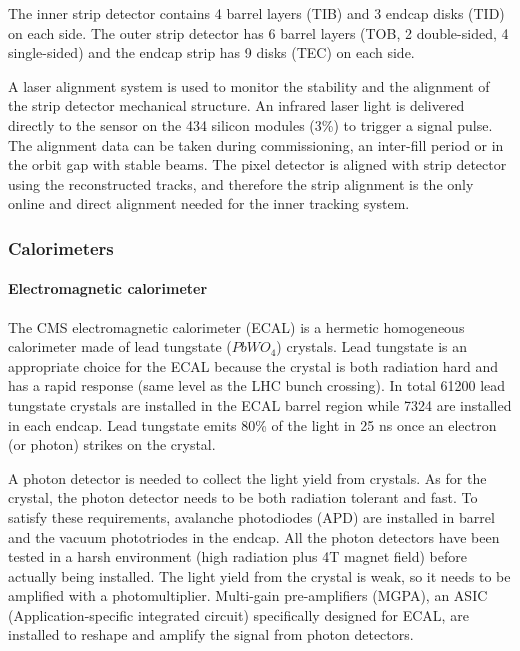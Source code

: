 The inner strip detector contains 4 barrel layers (TIB) and 3 endcap disks (TID) on each side. The outer strip detector has 6 barrel layers (TOB, 2 double-sided, 4 single-sided) and the endcap strip has 9 disks (TEC) on each side.

A laser alignment system\cite{Sirunyan:2017rbc} is used to monitor the stability and the alignment of the strip detector mechanical structure. An infrared laser light is delivered directly to the sensor on the 434 silicon modules (3\%) to trigger a signal pulse. The alignment data can be taken during commissioning, an inter-fill period or in the orbit gap with stable beams. The pixel detector is aligned with strip detector using the reconstructed tracks, and therefore the strip alignment is the only online and direct alignment needed for the inner tracking system. 

\subsubsection{Calorimeters}

\paragraph{Electromagnetic calorimeter}
The CMS electromagnetic calorimeter (ECAL) is a hermetic homogeneous calorimeter made of lead tungstate ($PbWO_{4}$) crystals. Lead tungstate is an appropriate choice for the ECAL because the crystal is both radiation hard and has a rapid response (same level as the LHC bunch crossing). In total 61200 lead tungstate crystals are installed in the ECAL barrel region while 7324 are installed in each endcap. Lead tungstate emits 80\% of the light in 25 ns once an electron (or photon) strikes on the crystal.

A photon detector is needed to collect the light yield from crystals. As for the crystal, the photon detector needs to be both radiation tolerant and fast. To satisfy these requirements, avalanche photodiodes (APD) are installed in barrel and the vacuum phototriodes in the endcap. All the photon detectors have been tested in a harsh environment (high radiation plus 4T magnet field) before actually being installed. The light yield from the crystal is weak, so it needs to be amplified with a photomultiplier. Multi-gain pre-amplifiers (MGPA), an ASIC (Application-specific integrated circuit) specifically designed for ECAL, are installed to reshape and amplify the signal from photon detectors.

